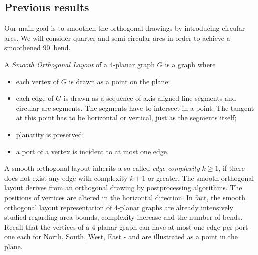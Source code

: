 \subsection{Previous results}
Our main goal is to smoothen the orthogonal drawings by introducing circular arcs. We will consider quarter and semi circular arcs in order to achieve a smoothened 90\degree~bend.
\begin{definition}
	A \textit{Smooth Orthogonal Layout} of a 4-planar graph $G$ is a graph where
	\begin{itemize}
		\item each vertex of $G$ is drawn as a point on the plane;
		\item each edge of $G$ is drawn as a sequence of axis aligned line segments and circular arc segments. The segments have to intersect in a point. The tangent at this point has to be horizontal or vertical, just as the segments itself;
		\item planarity is preserved;
		\item a port of a vertex is incident to at most one edge.
	\end{itemize}
\end{definition}
A smooth orthogonal layout inherits a so-called \textit{edge complexity} $k \geq 1$, if there does not exist any edge with complexity $k+1$ or greater. The smooth orthogonal layout derives from an orthogonal drawing by postprocessing algorithms. The positions of vertices are altered in the horizontal direction.
In fact, the smooth orthogonal layout representation of 4-planar graphs are already intensively studied regarding area bounds, complexity increase and the number of bends. Recall that the vertices of a 4-planar graph can have at most one edge per port - one each for North, South, West, East - and are illustrated as a point in the plane.

